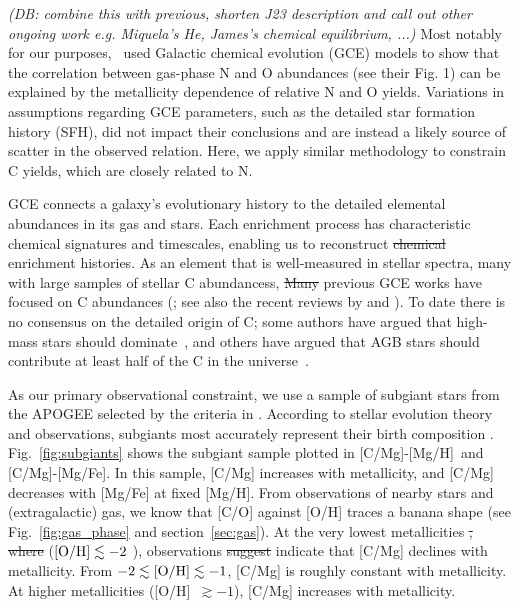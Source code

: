 \documentclass[fleqn,
usenatbib]{mnras}
\newcommand{\citetjack}{\citet{jack}}
\newcommand{\apogee}{APOGEE}
\newcommand{\caah}{[C/Mg]-[Mg/H]}
\newcommand{\caafe}{[C/Mg]-[Mg/Fe]}
\newcommand{\strike}[1]{{\color{ForestGreen} \sout{#1}}}
\newcommand{\add}[1]{{\color{ForestGreen} #1}}
\newcommand{\dbadd}[1]{{\color{Thistle} #1}}
\newcommand{\dbnote}[1]{{\color{Thistle} \textit{\small (DB: #1)}}}
\begin{document}
\dbnote{combine this with previous, shorten J23 description and call out other ongoing work e.g. Miquela's He, James's chemical equilibrium, ...}
Most notably for our purposes,~\citet{james+23} used Galactic chemical evolution (GCE) models to show that the correlation between gas-phase N and O abundances (see their Fig. 1) can be explained by the metallicity dependence of relative N and O yields. 
Variations in assumptions regarding GCE parameters, such as the detailed star formation history (SFH), did not impact their conclusions and are instead a likely source of scatter in the observed relation.
Here, we apply similar methodology to constrain C yields, which are closely related to N.




GCE connects a galaxy's evolutionary history to the detailed elemental abundances in its gas and stars.
Each enrichment process has characteristic chemical signatures and timescales, enabling us to reconstruct \strike{chemical} \add{enrichment} histories.
\add{As an element that is well-measured in stellar spectra, many} \dbadd{with large samples of stellar C abundancess}, \strike{Many} previous GCE works \add{have} focused on C abundances (\citealt{DTS78, BF06, prantzos+18, berg+19}; see also the recent reviews by \citealt{romano22} and \citealt{RM21}).
To date there is no consensus on the detailed origin of C; some authors have argued that high-mass stars should dominate~\citep[e.g.][]{prantzos+94, HEK00, romano+20, franchini+20, gustafsson22}, and others have argued that AGB stars should contribute at least half of the C in the universe~\citep[e.g.][]{tinsley79, chiappini+03, mattsson10, KKU11, rybizki+17, KKL20}. 

    As our primary observational constraint, we use a sample of subgiant stars from the \apogee{} \citep{apogee17} selected by the criteria in \citetjack.
According to stellar evolution theory and observations, subgiants most accurately represent their birth composition \citep{gilroy89, korn+07, lind+08, souto+18, souto19}.
Fig.~\ref{fig:subgiants} shows the subgiant sample plotted in \caah\ and \caafe{}.\footnotemark{} In this sample, [C/Mg] increases with metallicity, and [C/Mg] decreases with [Mg/Fe] at fixed [Mg/H]. 
From observations of nearby stars and (extragalactic) gas, we know that [C/O] against [O/H] traces a banana shape (see Fig.~\ref{fig:gas_phase} and section~\ref{sec:gas}).
At the very lowest metallicities\strike{, where} \add{(}$[{\rm O/H}]\lesssim-2$\add{)},%
%
observations \strike{suggest} \add{indicate} that [C/Mg] declines with metallicity.
From $-2 \lesssim {\rm [O/H]}\lesssim -1$, [C/Mg] is roughly constant with metallicity. 
At higher metallicities ([O/H]~$\gtrsim -1$), [C/Mg] increases with metallicity.
\end{document}
